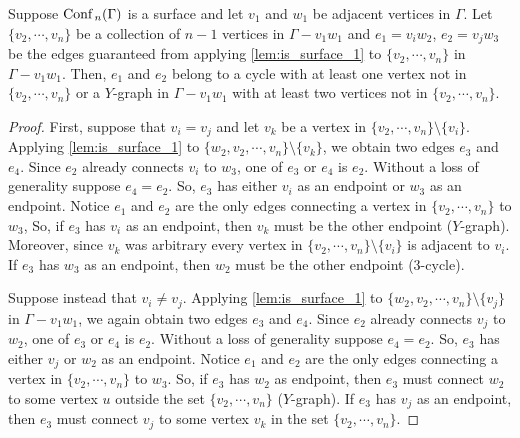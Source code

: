 \begin{lem}
    \label{lem:is_surface_2}
    Suppose \(\text{Conf}\,_n(\Gamma)\) is a surface and let \(v_1\) and \(w_1\) be adjacent vertices in \(\Gamma\).
    Let \(\{v_2, \cdots, v_n\}\) be a collection of \(n-1\) vertices in \(\Gamma - v_1 w_1\) and \(e_1 = v_i w_2\), \(e_2 = v_j w_3\) be the edges guaranteed 
    from applying \ref{lem:is_surface_1} to \(\{v_2, \cdots, v_n\}\) in \(\Gamma - v_1 w_1\).
    Then, \(e_1\) and \(e_2\) belong to a cycle with at least one vertex not in \(\{v_2, \cdots, v_n\}\) or a \(Y\)-graph in \(\Gamma - v_1 w_1\)
    with at least two vertices not in \(\{v_2, \cdots, v_n\}\).
\end{lem}
\begin{proof}
    First, suppose that \(v_i = v_j\) and let \(v_k\) be a vertex in \(\{v_2, \cdots, v_n\}\setminus\{v_i\}\).
    Applying \ref{lem:is_surface_1} to \(\{w_2, v_2, \cdots, v_n\}\setminus\{v_k\}\),
    we obtain two edges \(e_3\) and \(e_4\).
    Since \(e_2\) already connects \(v_i\) to \(w_3\), one of \(e_3\) or \(e_4\) is \(e_2\).
    Without a loss of generality suppose \(e_4 = e_2\).
    So, \(e_3\) has either \(v_i\) as an endpoint or \(w_3\) as an endpoint.
    Notice \(e_1\) and \(e_2\) are the only edges connecting a vertex in \(\{v_2, \cdots, v_n\}\) to \(w_3\),
    So, if \(e_3\) has \(v_i\) as an endpoint, then \(v_k\) must be the other endpoint (\(Y\)-graph).
    Moreover, since \(v_k\) was arbitrary every vertex in \(\{v_2, \cdots, v_n\}\setminus\{v_i\}\) is adjacent to \(v_i\).
    If \(e_3\) has \(w_3\) as an endpoint, then \(w_2\) must be the other endpoint (\(3\)-cycle).

    Suppose instead that \(v_i \neq v_j\).
    Applying \ref{lem:is_surface_1} to \(\{w_2, v_2, \cdots, v_n\}\setminus\{v_j\}\) in \(\Gamma - v_1 w_1\),
    we again obtain two edges \(e_3\) and \(e_4\).
    Since \(e_2\) already connects \(v_j\) to \(w_2\), one of \(e_3\) or \(e_4\) is \(e_2\).
    Without a loss of generality suppose \(e_4 = e_2\).
    So, \(e_3\) has either \(v_j\) or \(w_2\) as an endpoint.
    Notice \(e_1\) and \(e_2\) are the only edges connecting a vertex in \(\{v_2, \cdots, v_n\}\) to \(w_3\).
    So, if \(e_3\) has \(w_2\) as endpoint, then \(e_3\) must connect \(w_2\) to some vertex \(u\) outside the set \(\{v_2, \cdots, v_n\}\) (\(Y\)-graph).
    If \(e_3\) has \(v_j\) as an endpoint, then \(e_3\) must connect \(v_j\) to some vertex \(v_k\) in the set \(\{v_2, \cdots, v_n\}\).


\end{proof}
